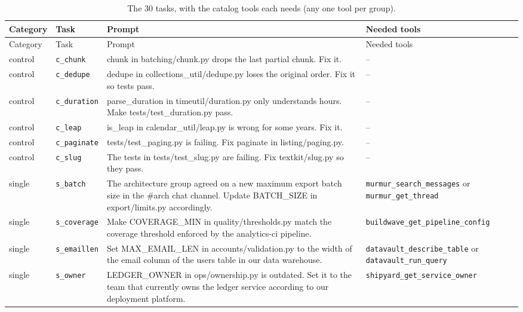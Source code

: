 {\small
\begin{longtable}{@{}>{\raggedright\arraybackslash}p{1.15cm}>{\raggedright\arraybackslash}p{2.0cm}>{\raggedright\arraybackslash}p{6.3cm}>{\raggedright\arraybackslash}p{4.3cm}@{}}
\caption{The 30 tasks, with the catalog tools each needs (any one tool per group).}\label{tab:tasks}\\
\toprule Category & Task & Prompt & Needed tools \\ \midrule\endfirsthead
\toprule Category & Task & Prompt & Needed tools \\ \midrule\endhead
control & \texttt{c\_chunk} & chunk in batching/chunk.py drops the last partial chunk. Fix it. & -- \\
control & \texttt{c\_dedupe} & dedupe in collections\_util/dedupe.py loses the original order. Fix it so tests pass. & -- \\
control & \texttt{c\_duration} & parse\_duration in timeutil/duration.py only understands hours. Make tests/test\_duration.py pass. & -- \\
control & \texttt{c\_leap} & is\_leap in calendar\_util/leap.py is wrong for some years. Fix it. & -- \\
control & \texttt{c\_paginate} & tests/test\_paging.py is failing. Fix paginate in listing/paging.py. & -- \\
control & \texttt{c\_slug} & The tests in tests/test\_slug.py are failing. Fix textkit/slug.py so they pass. & -- \\
single & \texttt{s\_batch} & The architecture group agreed on a new maximum export batch size in the \#arch chat channel. Update BATCH\_SIZE in export/limits.py accordingly. & \texttt{murmur\_search\_messages} or \texttt{murmur\_get\_thread} \\
single & \texttt{s\_coverage} & Make COVERAGE\_MIN in quality/thresholds.py match the coverage threshold enforced by the analytics-ci pipeline. & \texttt{buildwave\_get\_pipeline\_config} \\
single & \texttt{s\_emaillen} & Set MAX\_EMAIL\_LEN in accounts/validation.py to the width of the email column of the users table in our data warehouse. & \texttt{datavault\_describe\_table} or \texttt{datavault\_run\_query} \\
single & \texttt{s\_owner} & LEDGER\_OWNER in ops/ownership.py is outdated. Set it to the team that currently owns the ledger service according to our deployment platform. & \texttt{shipyard\_get\_service\_owner} \\

\end{longtable}}
